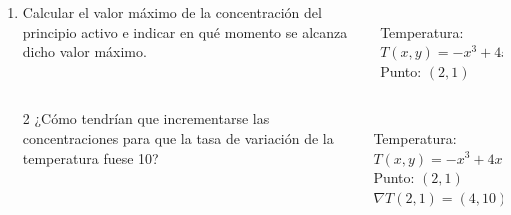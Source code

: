 \documentclass[aspectratio=169,10pt,xcolor=dvipsnames,t]{beamer}
\begin{document}
\begin{frame}
  \begin{columns}
    \begin{column}[T]{0.7\textwidth}
      \begin{enumerate}
\item Calcular el valor máximo de la concentración del principio activo e indicar en qué momento se alcanza dicho valor máximo.
      \end{enumerate}
    \end{column}
    \quad
    \begin{column}[T]{0.3\textwidth}
      \\
      Temperatura: $T(x,y)=-x^3+4x^2y-3y^2$\\
      Punto: $(2,1)$
    \end{column}
  \end{columns}
\end{frame}


\begin{frame}
  \begin{columns}
    \begin{column}[T]{0.7\textwidth}
      \begin{enumerate}
        \item[2] ¿Cómo tendrían que incrementarse las concentraciones para que la tasa de variación de la temperatura fuese 10?
      \end{enumerate}
    \end{column}
    \quad
    \begin{column}[T]{0.3\textwidth}
      \\
      Temperatura: $T(x,y)=-x^3+4x^2y-3y^2$\\
      Punto: $(2,1)$\\
      $\nabla T(2,1) = (4, 10)$
    \end{column}
  \end{columns}
\end{frame}
\end{document}
